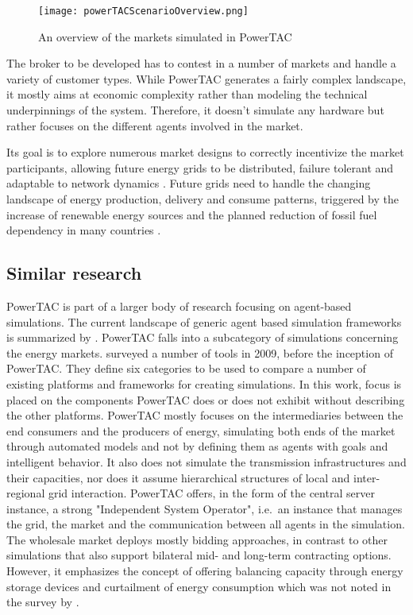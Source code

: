 \begin{figure}[h]%
    \texttt{[image: powerTACScenarioOverview.png]}
    \caption{An overview of the markets simulated in PowerTAC}
    \label{fig:powertacoverview}
\end{figure}


The broker to be developed has to contest in a number of markets and handle a variety of customer types. While
\ac{PowerTAC} generates a fairly complex landscape, it mostly aims at economic complexity rather than
modeling the technical underpinnings of the system. Therefore, it doesn't simulate any hardware but rather focuses on the
different agents involved in the market.

Its goal is to explore numerous market designs to correctly incentivize the market participants, allowing future
energy grids to be distributed, failure tolerant and adaptable to network dynamics \citep{ketter2015competitive}. Future
grids need to handle the changing landscape of energy production, delivery and consume patterns, triggered by the
increase of renewable energy sources and the planned reduction of fossil fuel dependency in many countries
\citep[p.13]{smartgrids2012smartgrids}.  

\subsection{Similar research}%

\ac{PowerTAC} is part of a larger body of research focusing on agent-based simulations. The current landscape of generic
agent based simulation frameworks is summarized by \citet{abar2017agent}. \ac{PowerTAC} falls into a subcategory of
simulations concerning the energy markets. \citet{zhou2007agent} surveyed a number of tools in 2009, before the
inception of \ac{PowerTAC}. They define six categories to be used to compare a number of existing platforms and
frameworks for creating simulations. In this work, focus is placed on the components \ac{PowerTAC} does or does not
exhibit without describing the other platforms. \ac{PowerTAC} mostly focuses on the intermediaries between the end
consumers and the producers of energy, simulating both ends of the market through automated models and not by defining
them as agents with goals and intelligent behavior. It also does not simulate the transmission infrastructures and their
capacities, nor does it assume hierarchical structures of local and inter-regional grid interaction. \ac{PowerTAC} offers,
in the form of the central server instance, a strong "Independent System Operator", i.e.\ an instance that manages the
grid, the market and the communication between all agents in the simulation. The wholesale market deploys mostly
bidding approaches, in contrast to other simulations that also support bilateral mid- and long-term contracting options.
However, it emphasizes the concept of offering balancing capacity through energy storage devices and curtailment of
energy consumption which was not noted in the survey by \citet{zhou2007agent}.

